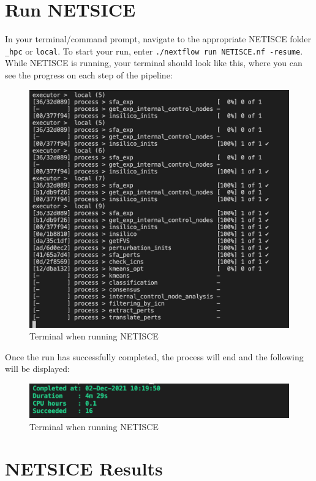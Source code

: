 \documentclass[
]{book}
\theoremstyle{definition}
\theoremstyle{definition}
\theoremstyle{definition}
\theoremstyle{definition}
\theoremstyle{remark}
\begin{document}
\hypertarget{run-netsice}{%
\section{Run NETSICE}\label{run-netsice}}

In your terminal/command prompt, navigate to the appropriate NETISCE folder \texttt{\_hpc} or \texttt{local}. To start your run, enter \texttt{./nextflow\ run\ NETISCE.nf\ -resume}.
While NETISCE is running, your terminal should look like this, where you can see the progress on each step of the pipeline:

\begin{figure}

{\centering \includegraphics[width=0.5\linewidth]{images/running_shot} 

}

\caption{Terminal when running NETISCE}\label{fig:unnamed-chunk-6}
\end{figure}

Once the run has successfully completed, the process will end and the following will be displayed:

\begin{figure}

{\centering \includegraphics[width=0.5\linewidth]{images/completed} 

}

\caption{Terminal when running NETISCE}\label{fig:unnamed-chunk-7}
\end{figure}

\hypertarget{netsice-results}{%
\section{NETSICE Results}\label{netsice-results}}
\end{document}
